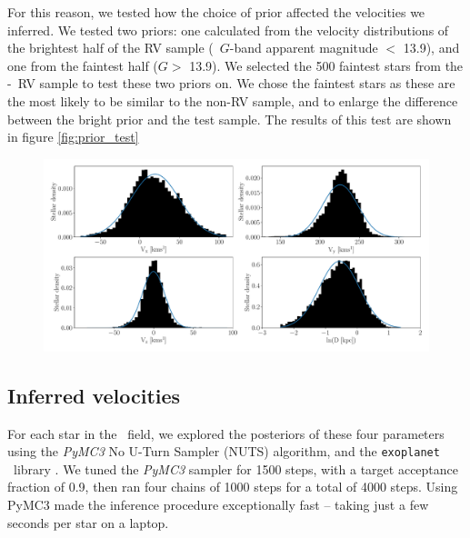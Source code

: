 For this reason, we tested how the choice of prior affected the velocities we
inferred.
We tested two priors: one calculated from the velocity distributions of the
brightest half of the RV sample (\gaia\ $G$-band apparent magnitude $<$ 13.9),
and one from the faintest half ($G > $ 13.9).
We selected the 500 faintest stars from the \gaia-\lamost\ RV sample to test
these two priors on.
We chose the faintest stars as these are the most likely to be similar to the
non-RV sample, and to enlarge the difference between the bright prior and the
test sample.
The results of this test are shown in figure \ref{fig:prior_test}
\begin{figure}[ht!]
\caption{
    }
  \centering
    \includegraphics[width=1\textwidth]{prior_distributions}
\label{fig:prior_distributions}
\end{figure}

\subsection{Inferred velocities}

For each star in the \kepler\ field, we explored the posteriors of these four
parameters using the {\it PyMC3} No U-Turn Sampler (NUTS) algorithm, and the
{\tt exoplanet} \python\ library .
We tuned the {\it PyMC3} sampler for 1500 steps, with a target acceptance
fraction of 0.9, then ran four chains of 1000 steps for a total of 4000 steps.
Using PyMC3 made the inference procedure exceptionally fast -- taking just a
few seconds per star on a laptop.

